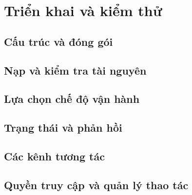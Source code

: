 \par{}
\section{Triển khai và kiểm thử}\label{section:implementation-1}

\par{}
\subsection{Cấu trúc và đóng gói}\label{subsection:implementation-2}

\par{}
\subsection{Nạp và kiểm tra tài nguyên}\label{subsection:implementation-3}

\par{}
\subsection{Lựa chọn chế độ vận hành}\label{subsection:implementation-4}

\par{}
\subsection{Trạng thái và phản hồi}\label{subsection:implementation-5}

\par{}
\subsection{Các kênh tương tác}\label{subsection:implementation-6}

\par{}
\subsection{Quyền truy cập và quản lý thao tác}\label{subsection:implementation-7}

